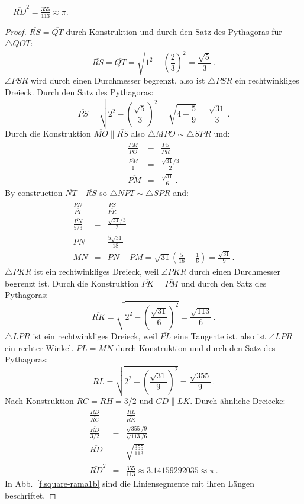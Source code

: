 \begin{theorem}
$\quad\overline{RD}^2=\displaystyle\frac{355}{113}\approx \pi$.
\end{theorem}


\begin{proof}
$\overline{RS}=\overline{QT}$ durch Konstruktion und durch den Satz des Pythagoras für $\triangle QOT$:
\[
\overline{RS} =\overline{QT} =\sqrt{1^2-\left(\frac{2}{3}\right)^2}=\frac{\sqrt{5}}{3}\,.
\]
$\angle PSR$ wird durch einen Durchmesser begrenzt, also ist $\triangle PSR$ ein rechtwinkliges Dreieck. Durch den Satz des Pythagoras:
\[
\overline{PS} = \sqrt{2^2-\left(\frac{\sqrt{5}}{3}\right)^2}=\sqrt{4-\frac{5}{9}}=\frac{\sqrt{31}}{3}\,.
\]
Durch die Konstruktion $\overline{MO}\parallel \overline{RS}$ also
$\triangle MPO\sim \triangle SPR$ und:
%
\begin{eqnarray*}
\frac{\overline{PM}}{\overline{PO}}&=&\frac{\overline{PS}}{\overline{PR}}\\
\frac{\overline{PM}}{1}&=&\frac{\sqrt{31}/3}{2}\\
\overline{PM}&=&\frac{\sqrt{31}}{6}\,.
\end{eqnarray*}
By construction $\overline{NT}\parallel \overline{RS}$ so 
$\triangle NPT\sim \triangle SPR$ and:
\begin{eqnarray*}
\frac{\overline{PN}}{\overline{PT}}&=&\frac{\overline{PS}}{\overline{PR}}\\
\frac{\overline{PN}}{5/3}&=&\frac{\sqrt{31}/3}{2}\\
\overline{PN}&=&\frac{5\sqrt{31}}{18}\\
\overline{MN}&=&\overline{PN}-\overline{PM}=\sqrt{31}\left(\frac{5}{18}-\frac{1}{6}\right) = \frac{\sqrt{31}}{9}\,.
\end{eqnarray*}
$\triangle PKR$ ist ein rechtwinkliges Dreieck, weil $\angle PKR$ durch einen Durchmesser begrenzt ist. Durch die Konstruktion $\overline{PK}=\overline{PM}$ und durch den Satz des Pythagoras:
\[
\overline{RK}=\sqrt{2^2-\left(\frac{\sqrt{31}}{6}\right)^2} = \frac{\sqrt{113}}{6}\,.
\]
$\triangle LPR$ ist ein rechtwinkliges Dreieck, weil $\overline{PL}$ eine Tangente ist, also ist $\angle LPR$ ein rechter Winkel. $\overline{PL}=\overline{MN}$ durch Konstruktion und durch den Satz des Pythagoras:
\[
\overline{RL}=\sqrt{2^2+\left(\frac{\sqrt{31}}{9}\right)^2} = \frac{\sqrt{355}}{9}\,.
\]
Nach Konstruktion
$\overline{RC}=\overline{RH}=3/2$ und $\overline{CD} \parallel \overline{LK}$. Durch ähnliche Dreiecke:
%
\begin{eqnarray*}
\frac{\overline{RD}}{\overline{RC}}&=&\frac{\overline{RL}}{\overline{RK}}\\
\frac{\overline{RD}}{3/2}&=&\frac{\sqrt{355}/9}{\sqrt{113}/6}\\
\overline{RD}&=&\sqrt{\frac{355}{113}}\\
\overline{RD}^2&=&\frac{355}{113}\approx 3.14159292035\approx \pi\,.
\end{eqnarray*}
In Abb.~\ref{f.square-rama1b} sind die Liniensegmente mit ihren Längen beschriftet.
\end{proof}

